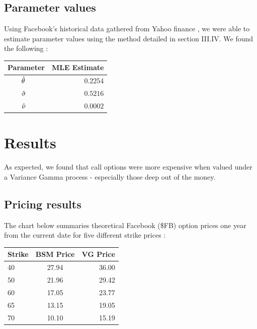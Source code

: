 \documentclass[twoside]{article}
\begin{document}
\begin{multicols}{2}
\subsection{Parameter values}
Using Facebook's historical data gathered from Yahoo finance \cite{yahoofinance}, we were able to estimate parameter values using the method detailed in section III.IV. We found the following \cite{Rlang} \cite{e1071}:
\begin{center}{
\begin{tabular}{ | l | r | }
\hline
  Parameter & MLE Estimate \\
\hline  
$\hspace{7mm} \hat{\theta}$ & $0.2254$  \\
\hline
$\hspace{7mm}\hat{\sigma}$ & $0.5216$  \\
\hline
$\hspace{7mm}\hat{\nu}$ & $0.0002$\\
\hline
\end{tabular}
}\end{center}
\section{Results}
As expected, we found that call options were more expensive when valued under a Variance Gamma process - especially those deep out of the money.

\subsection{Pricing results}

The chart below summaries theoretical Facebook (\$FB) option prices one year from the current date for five different strike prices \cite{Rlang}:

\begin{center}{
\begin{tabular}{ | l | c | r | }
\hline
  Strike & BSM Price & VG Price \\
\hline  
40 & 27.94 & 36.00 \\
\hline
50 & 21.96 & 29.42 \\
\hline
60 & 17.05 & 23.77 \\
\hline
65 & 13.15 & 19.05 \\
\hline
70 & 10.10 & 15.19 \\
\hline
\end{tabular}
}\end{center}

\end{multicols}
\end{document}

